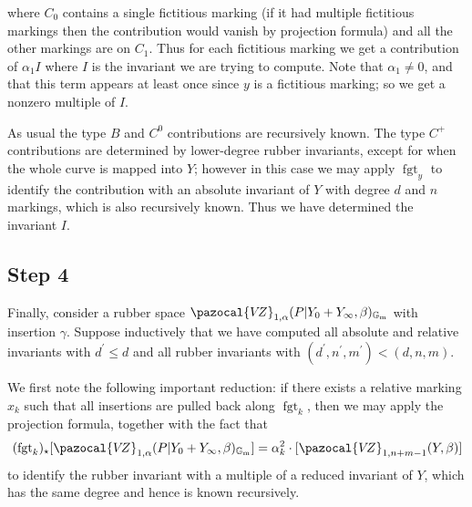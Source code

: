 \documentclass[11pt]{amsart}
\newcommand{\sqC}{\scalebox{0.8}[1.3]{$\sqsubset$}}
\newcommand{\VZ}{\pazocal{V\!Z}}
\newcommand{\st}{\star}
\newcommand{\Gm}{\mathbb{G}_{\text{m}}}
\newcommand{\fgt}{\operatorname{fgt}}
\theoremstyle{definition}
\theoremstyle{definition}
\begin{document}
\begin{center}
\end{center}
where $C_0$ contains a single fictitious marking (if it had multiple fictitious markings then the contribution would vanish by projection formula) and all the other markings are on $C_1$. Thus for each fictitious marking we get a contribution of $\alpha_1 I$ where $I$ is the invariant we are trying to compute. Note that $\alpha_1 \neq 0$, and that this term appears at least once since $y$ is a fictitious marking; so we get a nonzero multiple of $I$.

As usual the type $B$ and $C^0$ contributions are recursively known. The type $C^+$ contributions are determined by lower-degree rubber invariants, except for when the whole curve is mapped into $Y$; however in this case we may apply $\fgt_y$ to identify the contribution with an absolute invariant of $Y$ with degree $d$ and $n$ markings, which is also recursively known. Thus we have determined the invariant $I$.

\subsection*{Step 4} Finally, consider a rubber space $\VZ_{1,\alpha}(P|Y_0+Y_\infty,\beta)_{\Gm}$ with insertion $\gamma$. Suppose inductively that we have computed all absolute and relative invariants with $d^\prime \leq d$ and all rubber invariants with $(d^\prime,n^\prime,m^\prime) < (d,n,m)$.

We first note the following important reduction: if there exists a relative marking $x_k$ such that all insertions are pulled back along $\fgt_{k}$, then we may apply the projection formula, together with the fact that
\begin{equation*} (\fgt_{k})_\st [\VZ_{1,\alpha}(P|Y_0+Y_\infty,\beta)_{\Gm}] = \alpha_k^2 \cdot [\VZ_{1,n+m-1}(Y,\beta)] \end{equation*}
to identify the rubber invariant with a multiple of a reduced invariant of $Y$, which has the same degree and hence is known recursively.
\end{document}
